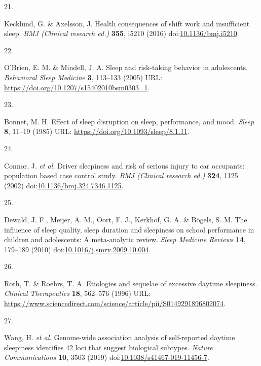 \documentclass[
  9pt,
]{scrbook}
\newlength{\cslhangindent}
\newlength{\csllabelwidth}
\newlength{\cslentryspacingunit} %
\newenvironment{CSLReferences}[2] %
 {%
  \setlength{\parindent}{0pt}
  \ifodd #1
  \let\oldpar\par
  \def\par{\hangindent=\cslhangindent\oldpar}
  \fi
  \setlength{\parskip}{#2\cslentryspacingunit}
 }%
 {}
\newcommand{\CSLLeftMargin}[1]{\parbox[t]{\csllabelwidth}{#1}}
\newcommand{\CSLRightInline}[1]{\parbox[t]{\linewidth - \csllabelwidth}{#1}\break}
\begin{document}
\begin{CSLReferences}{0}{0}
\leavevmode{}%
\CSLLeftMargin{21. }%
\CSLRightInline{Kecklund, G. \& Axelsson, J. Health consequences of
shift work and insufficient sleep. \emph{BMJ (Clinical research ed.)}
\textbf{355}, i5210 (2016)
doi:\href{https://doi.org/10.1136/bmj.i5210}{10.1136/bmj.i5210}.}

\leavevmode{}%
\CSLLeftMargin{22. }%
\CSLRightInline{O'Brien, E. M. \& Mindell, J. A. Sleep and risk-taking
behavior in adolescents. \emph{Behavioral Sleep Medicine} \textbf{3},
113--133 (2005) URL: \url{https://doi.org/10.1207/s15402010bsm0303_1}.}

\leavevmode{}%
\CSLLeftMargin{23. }%
\CSLRightInline{Bonnet, M. H. Effect of sleep disruption on sleep,
performance, and mood. \emph{Sleep} \textbf{8}, 11--19 (1985) URL:
\url{https://doi.org/10.1093/sleep/8.1.11}.}

\leavevmode{}%
\CSLLeftMargin{24. }%
\CSLRightInline{Connor, J. \emph{et al.} Driver sleepiness and risk of
serious injury to car occupants: population based case control study.
\emph{BMJ (Clinical research ed.)} \textbf{324}, 1125 (2002)
doi:\href{https://doi.org/10.1136/bmj.324.7346.1125}{10.1136/bmj.324.7346.1125}.}

\leavevmode{}%
\CSLLeftMargin{25. }%
\CSLRightInline{Dewald, J. F., Meijer, A. M., Oort, F. J., Kerkhof, G.
A. \& Bögels, S. M. The influence of sleep quality, sleep duration and
sleepiness on school performance in children and adolescents: A
meta-analytic review. \emph{Sleep Medicine Reviews} \textbf{14},
179--189 (2010)
doi:\href{https://doi.org/10.1016/j.smrv.2009.10.004}{10.1016/j.smrv.2009.10.004}.}

\leavevmode{}%
\CSLLeftMargin{26. }%
\CSLRightInline{Roth, T. \& Roehrs, T. A. Etiologies and sequelae of
excessive daytime sleepiness. \emph{Clinical Therapeutics} \textbf{18},
562--576 (1996) URL:
\url{https://www.sciencedirect.com/science/article/pii/S0149291896802074}.}

\leavevmode{}%
\CSLLeftMargin{27. }%
\CSLRightInline{Wang, H. \emph{et al.} Genome-wide association analysis
of self-reported daytime sleepiness identifies 42 loci that suggest
biological subtypes. \emph{Nature Communications} \textbf{10}, 3503
(2019)
doi:\href{https://doi.org/10.1038/s41467-019-11456-7}{10.1038/s41467-019-11456-7}.}


\end{CSLReferences}
\end{document}
